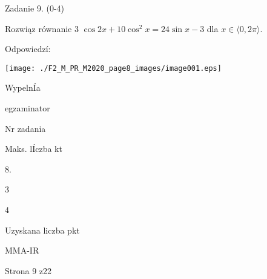 \documentclass[a4paper,12pt]{article}
\begin{document}
Zadanie 9. (0-4)

Rozwiąz równanie 3 $\cos 2x+10\cos^{2}x=24\sin x-3$ dla $x\in\langle 0, 2\pi\rangle.$

Odpowiedzí:
\begin{center}
\texttt{[image: ./F2\_M\_PR\_M2020\_page8\_images/image001.eps]}
\end{center}
WypelnÍa

egzaminator

Nr zadania

Maks. lÍczba kt

8.

3

4

Uzyskana liczba pkt

MMA-IR

Strona 9 z22
\end{document}
